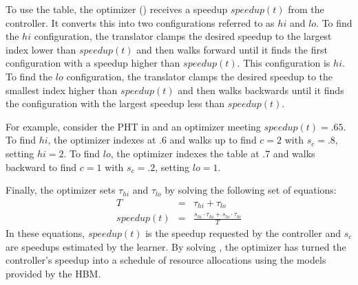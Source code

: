 To use the table, the optimizer () receives a
speedup $speedup(t)$ from the controller.  It converts this into two
configurations referred to as $hi$ and $lo$.  To find the $hi$
configuration, the translator clamps the desired speedup to the
largest index lower than $speedup(t)$ and then walks forward until it
finds the first configuration with a speedup higher than $speedup(t)$.
This configuration is $hi$.  To find the $lo$ configuration, the
translator clamps the desired speedup to the smallest index higher
than $speedup(t)$ and then walks backwards until it finds the
configuration with the largest speedup less than $speedup(t)$.

For example, consider the PHT in  and an optimizer
meeting $speedup(t) = .65$.  To find $hi$, the optimizer indexes at .6
and walks up to find $c=2$ with $s_c=.8$, setting $hi = 2$.  To find
$lo$, the optimizer indexes the table at .7 and walks backward to find
$c=1$ with $s_c=.2$, setting $lo = 1$.

Finally, the optimizer sets $\tau_{hi}$ and $\tau_{lo}$ by solving the
following set of equations:
\begin{eqnarray}
  T &=& \tau_{hi} + \tau_{lo}    \label{eqn:s1} \\
  speedup(t) &=& \frac{s_{hi} \cdot \tau_{hi} + s_{lo} \cdot \tau_{lo}}{T} \label{eqn:s2}
\end{eqnarray}
In these equations, $speedup(t)$ is the speedup requested by the
controller and $s_c$ are speedups estimated by the learner.  By
solving , the optimizer has turned the controller's
speedup into a schedule of resource allocations using the models
provided by the HBM.



